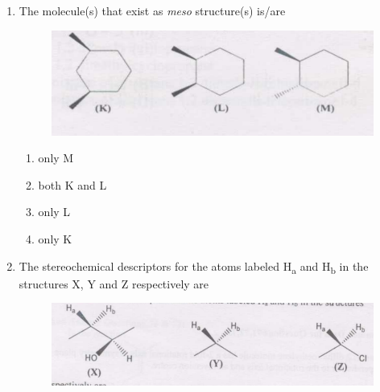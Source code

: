 \documentclass[journal,12pt,onecolumn]{IEEEtran}
\theoremstyle{remark}
\begin{document}
\begin{enumerate}
\begin{multicols}{2}
\begin{enumerate}
     \item   disrotatory, disrotatory, disrotatory
     \item   conrotatory, conrotatory, conrotatory
     \item   disrotatory, disrotatory, conrotatory
     \item   disrotatory, conrotatory, disrotatory
\end{enumerate}
\end{multicols}

  


\item  The molecule(s) that exist as \textit{meso} structure(s) is/are \hfill{}
\begin{figure}
    \centering
    \includegraphics[width=0.5\columnwidth]{figs/image9.png}
    \caption{}
    \label{fig:image9}
\end{figure}




\begin{multicols}{2}
\begin{enumerate}
   \item   only M
   \item   both K and L
   \item   only L
   \item   only K
\end{enumerate}
\end{multicols}

  

\item  The stereochemical descriptors for the atoms labeled H\textsubscript{a} and H\textsubscript{b} in the structures X, Y and Z respectively are \hfill{}
\begin{figure}
    \centering
    \includegraphics[width=0.5\columnwidth]{figs/image10.png}
    \caption{}
    \label{fig:figure10}
\end{figure}


\end{enumerate}
\end{document}
